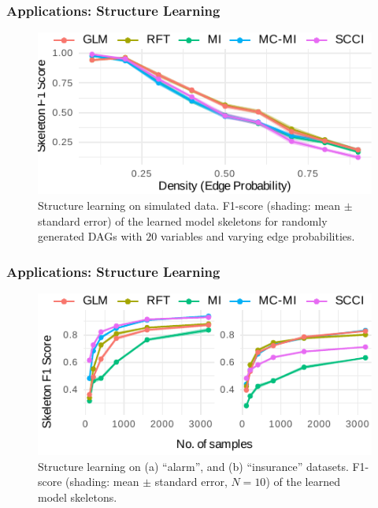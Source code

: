 \documentclass{beamer}
\begin{document}
\begin{frame}
	\frametitle{Applications: Structure Learning}
	\begin{figure}
		\centering
		\includegraphics{imgs/sl_density.pdf}
		\caption*{Structure learning on simulated data. F1-score
		(shading: mean $\pm$ standard error) of the learned model
		skeletons for randomly generated DAGs with $20$ variables and
		varying edge probabilities.}
	\end{figure}
\end{frame}

\begin{frame}
	\frametitle{Applications: Structure Learning}
	\begin{figure}
		\centering
		\includegraphics{imgs/sl.pdf}
		\caption*{Structure learning on (a) ``alarm'', and (b)
		``insurance'' datasets.  F1-score (shading: mean $\pm$ standard
		error, $N=10$) of the learned model skeletons.}
	\end{figure}
\end{frame}
\end{document}
